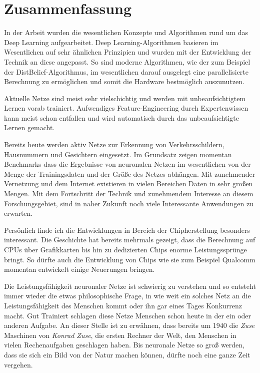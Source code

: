 \chapter{Zusammenfassung}

In der Arbeit wurden die wesentlichen Konzepte und Algorithmen rund um das Deep Learning aufgearbeitet. Deep Learning-Algorithmen basieren im Wesentlichen auf sehr ähnlichen Prinzipien und wurden mit der Entwicklung der Technik an diese angepasst. So sind moderne Algorithmen, wie der zum Beispiel der DistBelief-Algorithmus, im wesentlichen darauf ausgelegt eine parallelisierte Berechnung zu ermöglichen und somit die Hardware bestmöglich auszunutzen.

Aktuelle Netze sind meist sehr vielschichtig und werden mit unbeaufsichtigtem Lernen vorab trainiert. Aufwendiges Feature-Engineering durch Expertenwissen kann meist schon entfallen und wird automatisch durch das unbeaufsichtigte Lernen gemacht.

Bereits heute werden aktiv Netze zur Erkennung von Verkehrsschildern, Hausnummern und Gesichtern eingesetzt. Im Grundsatz zeigen momentan Benchmarks dass die Ergebnisse von neuronalen Netzen im wesentlichen von der Menge der Trainingsdaten und der Größe des Netzes abhängen. Mit zunehmender Vernetzung und dem Internet existieren in vielen Bereichen Daten in sehr großen Mengen. Mit dem Fortschritt der Technik und zunehmendem Interesse an diesem Forschungsgebiet, sind in naher Zukunft noch viele Interessante Anwendungen zu erwarten.

Persönlich finde ich die Entwicklungen in Bereich der Chipherstellung besonders interessant. Die Geschichte hat bereits mehrmals gezeigt, dass die Berechnung auf CPUs über Grafikkarten bis hin zu dedizierten Chips enorme Leistungssprünge bringt. So dürfte auch die Entwicklung von Chips wie sie zum Beispiel Qualcomm momentan entwickelt einige Neuerungen bringen.

Die Leistungsfähigkeit neuronaler Netze ist schwierig zu verstehen und so entsteht immer wieder die etwas philosophische Frage, in wie weit ein solches Netz an die Leistungsfähigkeit des Menschen kommt oder ihn gar eines Tages Konkurrenz macht. Gut Trainiert schlagen diese Netze Menschen schon heute in der ein oder anderen Aufgabe. An dieser Stelle ist zu erwähnen, dass bereits um 1940 die \emph{Zuse} Maschinen von \emph{Konrad Zuse}, die ersten Rechner der Welt, den Menschen in vielen Rechenaufgaben geschlagen haben. Bis neuronale Netze so groß werden, dass sie sich ein Bild von der Natur machen können, dürfte noch eine ganze Zeit vergehen.
